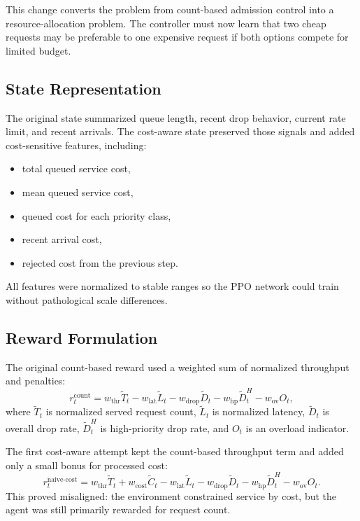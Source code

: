 \documentclass[conference]{IEEEtran}
\begin{document}
This change converts the problem from count-based admission control into a resource-allocation problem. The controller must now learn that two cheap requests may be preferable to one expensive request if both options compete for limited budget.

\subsection{State Representation}
The original state summarized queue length, recent drop behavior, current rate limit, and recent arrivals. The cost-aware state preserved those signals and added cost-sensitive features, including:

\begin{itemize}[leftmargin=1.5em]
    \item total queued service cost,
    \item mean queued service cost,
    \item queued cost for each priority class,
    \item recent arrival cost,
    \item rejected cost from the previous step.
\end{itemize}

All features were normalized to stable ranges so the PPO network could train without pathological scale differences.

\subsection{Reward Formulation}
The original count-based reward used a weighted sum of normalized throughput and penalties:
\begin{equation}
r_t^{\text{count}} =
w_{\text{thr}}\tilde{T}_t
- w_{\text{lat}}\tilde{L}_t
- w_{\text{drop}}\tilde{D}_t
- w_{\text{hp}}\tilde{D}^{H}_t
- w_{\text{ov}} O_t ,
\end{equation}
where $\tilde{T}_t$ is normalized served request count, $\tilde{L}_t$ is normalized latency, $\tilde{D}_t$ is overall drop rate, $\tilde{D}^{H}_t$ is high-priority drop rate, and $O_t$ is an overload indicator.

The first cost-aware attempt kept the count-based throughput term and added only a small bonus for processed cost:
\begin{equation}
r_t^{\text{naive-cost}} =
w_{\text{thr}}\tilde{T}_t
+ w_{\text{cost}}\tilde{C}_t
- w_{\text{lat}}\tilde{L}_t
- w_{\text{drop}}\tilde{D}_t
- w_{\text{hp}}\tilde{D}^{H}_t
- w_{\text{ov}} O_t.
\end{equation}
This proved misaligned: the environment constrained service by cost, but the agent was still primarily rewarded for request count.
\end{document}
